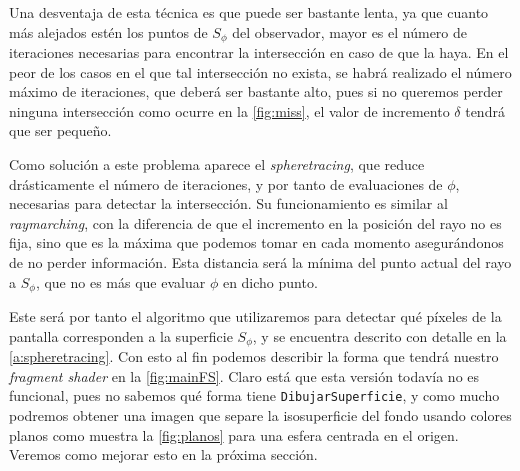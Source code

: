 Una desventaja de esta técnica es que puede ser bastante lenta, ya que cuanto más alejados estén los puntos de $S_\phi$ del observador, mayor es el número de iteraciones necesarias para encontrar la intersección en caso de que la haya. En el peor de los casos en el que tal intersección no exista, se habrá realizado el número máximo de iteraciones, que deberá ser bastante alto, pues si no queremos perder ninguna intersección como ocurre en la \autoref{fig:miss}, el valor de incremento $\delta$ tendrá que ser pequeño.\newline

Como solución a este problema aparece el \textit{spheretracing}, que reduce drásticamente el número de iteraciones, y por tanto de evaluaciones de $\phi$, necesarias para detectar la intersección. Su funcionamiento es similar al \textit{raymarching}, con la diferencia de que el incremento en la posición del rayo no es fija, sino que es la máxima que podemos tomar en cada momento asegurándonos de no perder información. Esta distancia será la mínima del punto actual del rayo a $S_\phi$, que no es más que evaluar $\phi$ en dicho punto.\newline

Este será por tanto el algoritmo que utilizaremos para detectar qué píxeles de la pantalla corresponden a la superficie $S_{\phi}$, y se encuentra descrito con detalle en la \autoref{a:spheretracing}. 
Con esto al fin podemos describir la forma que tendrá nuestro \textit{fragment shader} en la \autoref{fig:mainFS}. Claro está que esta versión todavía no es funcional, pues no sabemos qué forma tiene \texttt{DibujarSuperficie}, y como mucho podremos obtener una imagen que separe la isosuperficie del fondo usando colores planos como muestra la \autoref{fig:planos} para una esfera centrada en el origen. Veremos como mejorar esto en la próxima sección.

